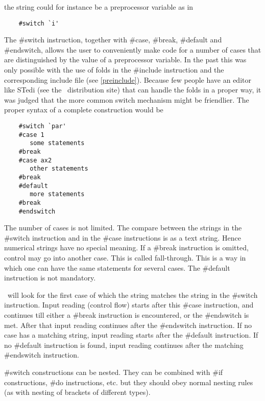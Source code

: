 \noindent the string could for instance be a preprocessor 
variable as in
\begin{verbatim}
    #switch `i'
\end{verbatim}
The \#switch instruction, together with 
\#case, \#break, \#default 
and \#endswitch, allows the user to conveniently make 
code for a number of cases that are distinguished by the value of a 
preprocessor variable. In the past this was only possible with the use of 
folds in the \#include instruction and the 
corresponding include file (see \ref{preinclude}). 
Because few people have an editor like STedi (see the \FORM\ distribution 
site) that can handle the folds in a proper way, it was judged that the 
more common switch mechanism might be friendlier. The proper syntax of a 
complete construction would be
\begin{verbatim}
    #switch `par'
    #case 1
       some statements
    #break
    #case ax2
       other statements
    #break
    #default
       more statements
    #break
    #endswitch
\end{verbatim}
The number of cases is not limited. The compare between the strings in the 
\#switch instruction and in the \#case instructions is as a text string. 
Hence numerical strings have no special meaning. If a \#break instruction 
is omitted, control may go into another case. This is called 
fall-through. 
This is a way in which one can have the same statements for several cases. 
The \#default instruction is not mandatory.

\FORM\ will look for the first case of which the string matches the string 
in the \#switch instruction. Input reading (control flow) starts after this 
\#case instruction, and continues till either a \#break instruction is 
encountered, or the \#endswitch is met. After that input reading continues 
after the \#endswitch instruction. If no case has a matching string, input 
reading starts after the \#default instruction. If no \#default instruction 
is found, input reading continues after the matching \#endswitch 
instruction.

\#switch constructions can be nested. They can be combined 
with \#if constructions, \#do instructions, etc. 
but they should obey normal nesting rules (as with nesting of 
brackets of different types).

